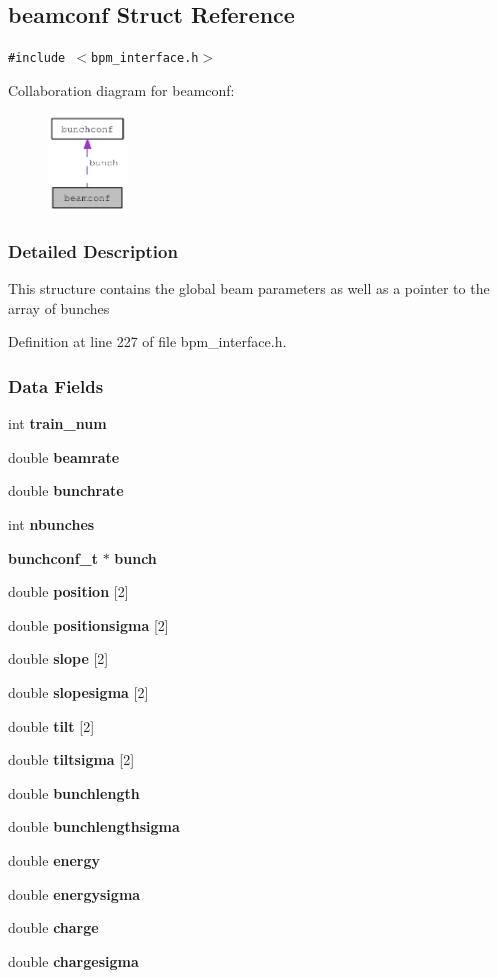 \subsection{beamconf Struct Reference}
\label{structbeamconf}
{\tt \#include $<$bpm\_\-interface.h$>$}

Collaboration diagram for beamconf:\nopagebreak
\begin{figure}[H]
\begin{center}
\leavevmode
\includegraphics[width=59pt]{structbeamconf__coll__graph}
\end{center}
\end{figure}


\subsubsection{Detailed Description}
This structure contains the global beam parameters as well as a pointer to the array of bunches 

Definition at line 227 of file bpm\_\-interface.h.\subsubsection*{Data Fields}
\begin{CompactItemize}
\item 
int {\bf train\_\-num}
\item 
double {\bf beamrate}
\item 
double {\bf bunchrate}
\item 
int {\bf nbunches}
\item 
{\bf bunchconf\_\-t} $\ast$ {\bf bunch}
\item 
double {\bf position} [2]
\item 
double {\bf positionsigma} [2]
\item 
double {\bf slope} [2]
\item 
double {\bf slopesigma} [2]
\item 
double {\bf tilt} [2]
\item 
double {\bf tiltsigma} [2]
\item 
double {\bf bunchlength}
\item 
double {\bf bunchlengthsigma}
\item 
double {\bf energy}
\item 
double {\bf energysigma}
\item 
double {\bf charge}
\item 
double {\bf chargesigma}
\end{CompactItemize}


